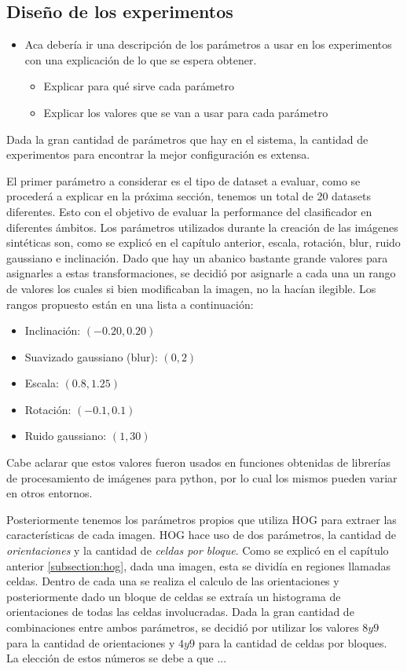 \subsection{Diseño de los experimentos}

	\begin{itemize}
		\item Aca debería ir una descripción de los parámetros a usar en los experimentos con una explicación de lo que se espera obtener.
		\begin{itemize}
			\item Explicar para qué sirve cada parámetro
			\item Explicar los valores que se van a usar para cada parámetro
		\end{itemize}
	\end{itemize}

	Dada la gran cantidad de parámetros que hay en el sistema, la cantidad de experimentos para encontrar la mejor configuración es extensa.
	
	El primer parámetro a considerar es el tipo de dataset a evaluar, como se procederá a explicar en la próxima sección, tenemos un total de 20 datasets diferentes. Esto con el objetivo de evaluar la performance del clasificador en diferentes ámbitos. Los parámetros utilizados durante la creación de las imágenes sintéticas son, como se explicó en el capítulo anterior, escala, rotación, blur, ruido gaussiano e inclinación. Dado que hay un abanico bastante grande valores para asignarles a estas transformaciones, se decidió por asignarle a cada una un rango de valores los cuales si bien modificaban la imagen, no la hacían ilegible. Los rangos propuesto están en una lista a continuación:
	\begin{itemize}
		\item Inclinación: $(-0.20, 0.20)$
		\item Suavizado gaussiano (blur): $(0, 2)$
		\item Escala: $(0.8, 1.25)$
		\item Rotación: $(-0.1, 0.1)$
		\item Ruido gaussiano: $(1, 30)$
	\end{itemize}
	
	Cabe aclarar que estos valores fueron usados en funciones obtenidas de librerías de procesamiento de imágenes para python, por lo cual los mismos pueden variar en otros entornos.
	
	Posteriormente tenemos los parámetros propios que utiliza HOG para extraer las características de cada imagen. HOG hace uso de dos parámetros, la cantidad de \textit{orientaciones} y la cantidad de \textit{celdas por bloque}. Como se explicó en el capítulo anterior \ref{subsection:hog}, dada una imagen, esta se dividía en regiones llamadas celdas. Dentro de cada una se realiza el calculo de las orientaciones y posteriormente dado un bloque de celdas se extraía un histograma de orientaciones de todas las celdas involucradas. Dada la gran cantidad de combinaciones entre ambos parámetros, se decidió por utilizar los valores $8 y 9$ para la cantidad de orientaciones y $4 y 9$ para la cantidad de celdas por bloques. La elección de estos números se debe a que ... 
	

